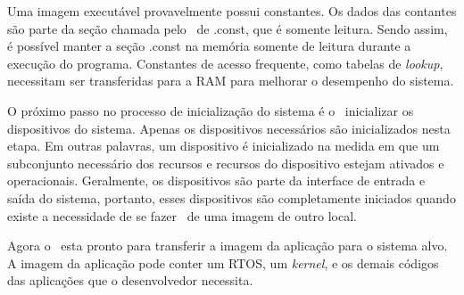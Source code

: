 Uma imagem executável provavelmente possui constantes. Os dados das contantes são parte da seção chamada pelo \linker\ de .const, que é somente leitura. Sendo assim, é possível manter a seção .const na memória somente de leitura durante a execução do programa. Constantes de acesso frequente, como tabelas de \textit{lookup}, necessitam ser transferidas para a RAM para melhorar o desempenho do sistema.

O próximo passo no processo de inicialização do sistema é o \loader\ inicializar os dispositivos do sistema. Apenas os dispositivos necessários são inicializados nesta etapa. Em outras palavras, um dispositivo é inicializado na medida em que um subconjunto necessário dos recursos e recursos do dispositivo estejam ativados e operacionais. Geralmente, os dispositivos são parte da interface de entrada e saída do sistema, portanto, esses dispositivos são completamente iniciados quando existe a necessidade de se fazer \download\ de uma imagem de outro local.

Agora o \loader\ esta pronto para transferir a imagem da aplicação para o sistema alvo. A imagem da aplicação pode conter um RTOS, um \textit{kernel}, e os demais códigos das aplicações que o desenvolvedor necessita.





